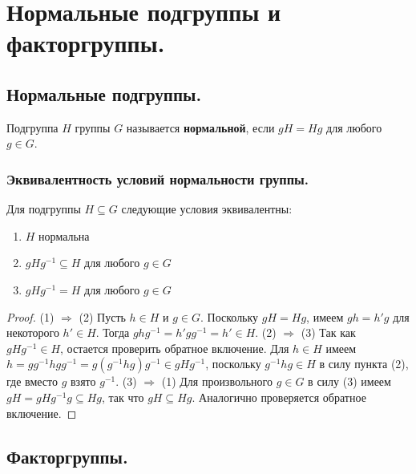 \section{Нормальные подгруппы и факторгруппы.}

\subsection{Нормальные подгруппы.}
\begin{definition}
    Подгруппа $H$ группы $G$ называется \textbf{нормальной}, если $gH = Hg$ для любого $g \in G$.
\end{definition}
\subsubsection{Эквивалентность условий нормальности группы.}
\begin{statement}
    Для подгруппы $H \subseteq G$ следующие условия эквивалентны:
    \begin{enumerate}
        \item $H$ нормальна
        \item $gHg^{-1} \subseteq H$ для любого $g \in G$
        \item $gHg^{-1} = H$ для любого $g \in G$
    \end{enumerate}
    \begin{proof}
        (1) $\Rightarrow$ (2) Пусть $h \in H$ и $g \in G$. Поскольку $gH = Hg$, имеем $gh = h'g$ для некоторого $h' \in H$. Тогда $ghg^{-1} = h'gg^{-1} = h' \in H$.
        \newline
        (2) $\Rightarrow$ (3) Так как $gHg^{-1} \in H$, остается проверить обратное включение. Для $h \in H$ имеем $h = gg^{-1}hgg^{-1} = g(g^{-1}hg)g^{-1} \in gHg^{-1}$, поскольку $g^{-1}hg \in H$ в силу пункта (2), где вместо $g$ взято $g^{-1}$.
        \newline
        (3) $\Rightarrow$ (1) Для произвольного $g \in G$ в силу (3) имеем $gH = gHg^{-1}g \subseteq Hg$, так что $gH \subseteq Hg$. Аналогично проверяется обратное включение.
        \newline
    \end{proof}
\end{statement}

\subsection{Факторгруппы.}
